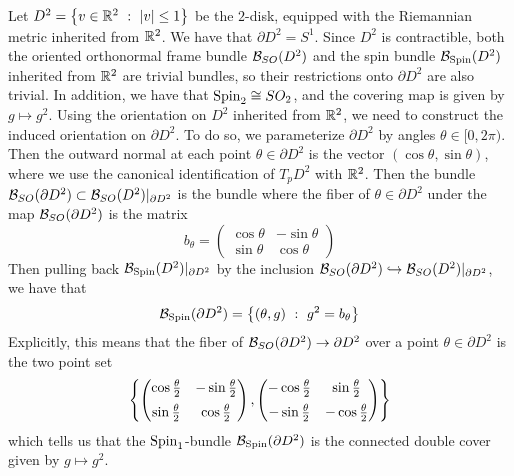 \begin{exmp}
Let $D^2 = \left\lbrace v \in \mathbb{R}^2 ~:~ |v| \leq 1 \right\rbrace$ be the $2$-disk, equipped with the
Riemannian metric inherited from $\mathbb{R}^2$. We have that $\partial D^2 = S^1$.
Since $D^2$ is contractible, both the oriented orthonormal frame bundle
$\mathcal{B}_{SO}(D^2)$ and the spin bundle $\mathcal{B}_{\mathrm{Spin}}(D^2)$ inherited from $\mathbb{R}^2$ are
trivial bundles, so their restrictions onto $\partial D^2$ are also trivial.
In addition, we have that $\mathrm{Spin}_2 \cong SO_2$, and the covering map is given
by $g \mapsto g^2$.
Using the orientation on $D^2$ inherited from $\mathbb{R}^2$, we need to construct
the induced orientation on $\partial D^2$. To do so, we parameterize
$\partial D^2$ by angles $\theta \in [0,2\pi)$. Then the outward normal
at each point $\theta \in \partial D^2$ is the vector $(\cos\theta, \sin\theta)$,
where we use the canonical identification of $T_pD^2$ with $\mathbb{R}^2$. Then
the bundle $\mathcal{B}_{SO}(\partial D^2) \subset \mathcal{B}_{SO}(D^2)\vert_{\partial D^2}$ is
the bundle where the fiber of $\theta \in \partial D^2$ under the map $
\mathcal{B}_{SO}(\partial D^2)$ is the matrix
\[
b_\theta = \begin{pmatrix}
\cos\theta & -\sin\theta \\
\sin\theta & \cos\theta
\end{pmatrix}
\]
Then pulling back $\mathcal{B}_{\mathrm{Spin}}(D^2)\vert_{\partial D^2}$ by the inclusion
$\mathcal{B}_{SO}(\partial D^2) \hookrightarrow \mathcal{B}_{SO}(D^2)\vert_{\partial D^2}$,
we have that
\[
\mathcal{B}_{\mathrm{Spin}}(\partial D^2) = \left\lbrace (\theta, g) ~:~ g^2 = b_\theta \right\rbrace
\]
Explicitly, this means that the fiber of $\mathcal{B}_{SO}(\partial D^2) \to \partial D^2$
over a point $\theta \in \partial D^2$ is the two point set
\[
\left\lbrace \begin{pmatrix}
\cos\frac{\theta}{2} & -\sin\frac{\theta}{2} \\[5pt]
\sin\frac{\theta}{2} & \cos\frac{\theta}{2}
\end{pmatrix},
\begin{pmatrix}
-\cos\frac{\theta}{2} & \sin\frac{\theta}{2} \\[5pt]
-\sin\frac{\theta}{2} & -\cos\frac{\theta}{2}
\end{pmatrix} \right\rbrace
\]
which tells us that the $\mathrm{Spin}_1$-bundle $\mathcal{B}_{\mathrm{Spin}}(\partial D^2)$ is the
connected double cover given by $g \mapsto g^2$.
\end{exmp}
%
